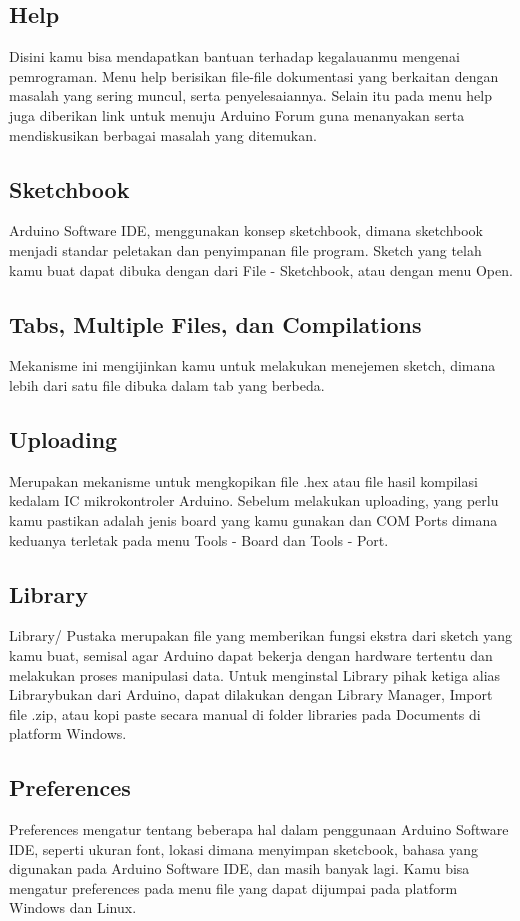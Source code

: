 \subsection{Help}
Disini kamu bisa mendapatkan bantuan terhadap kegalauanmu mengenai pemrograman. Menu help berisikan file-file dokumentasi yang berkaitan dengan masalah yang sering muncul, serta penyelesaiannya. Selain itu pada menu help juga diberikan link untuk menuju Arduino Forum guna menanyakan serta mendiskusikan berbagai masalah yang ditemukan.

\subsection{Sketchbook}
Arduino Software IDE, menggunakan konsep sketchbook, dimana sketchbook menjadi standar peletakan dan penyimpanan file program. Sketch yang telah kamu buat dapat dibuka dengan dari File - Sketchbook, atau dengan menu Open.

\subsection{Tabs, Multiple Files, dan Compilations}
Mekanisme ini mengijinkan kamu untuk melakukan menejemen sketch, dimana lebih dari satu file dibuka dalam tab yang berbeda.

\subsection{Uploading}
Merupakan mekanisme untuk mengkopikan file .hex atau file hasil kompilasi kedalam IC mikrokontroler Arduino. Sebelum melakukan uploading, yang perlu kamu pastikan adalah jenis board yang kamu gunakan dan COM Ports dimana keduanya terletak pada menu Tools - Board dan Tools - Port.

\subsection{Library}
Library/ Pustaka merupakan file yang memberikan fungsi ekstra dari sketch yang kamu buat, semisal agar Arduino dapat bekerja dengan hardware tertentu dan melakukan proses manipulasi data. Untuk menginstal Library pihak ketiga alias Librarybukan dari Arduino, dapat dilakukan dengan Library Manager, Import file .zip, atau kopi paste secara manual di folder libraries pada Documents di platform Windows.




\subsection{Preferences}
Preferences mengatur tentang beberapa hal dalam penggunaan Arduino Software IDE, seperti ukuran font, lokasi dimana menyimpan sketcbook, bahasa yang digunakan pada Arduino Software IDE, dan masih banyak lagi. Kamu bisa mengatur preferences pada menu file yang dapat dijumpai pada platform Windows dan Linux.
